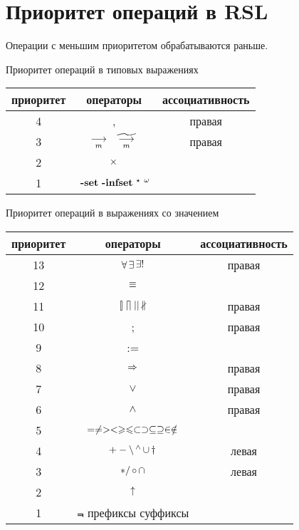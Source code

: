 \chapter{Приоритет операций в RSL}\label{sec:priority}

Операции с меньшим приоритетом обрабатываются раньше.

Приоритет операций в типовых выражениях
\begin{center}
\begin{tabular}{|c|c|c|}
\hline приоритет & операторы & ассоциативность\\
\hline  4 & , & правая\\
\hline  3 & $~\mathop{\longrightarrow}\limits_{m}~ ~\widetilde{~\mathop{\longrightarrow}\limits_{m}~}~$ & правая\\
\hline  2 & $\mathop{\times}$ & \\
\hline  1 & ${\ }\Set {\ }\Infset {\ }\List {\ }\Inflist$ & \\
\hline
\end{tabular}
\end{center}

Приоритет операций в выражениях со значением
\begin{center}
\begin{tabular}{|c|c|c|}
\hline приоритет & операторы & ассоциативность\\
\hline 13 & $\mathop{\forall} \mathop{\exists} \mathop{\exists!}$ & правая \\
\hline 12 & $\mathop{\equiv}$ & \\
\hline 11 & $\mathop{[\!]} \mathop{\lceil\!\rceil} || \mathop{\nparallel}$ & правая \\
\hline 10 & ; & правая \\
\hline 9 & := & \\
\hline 8 & $\mathop{\Rightarrow}$ & правая \\
\hline 7 & $\vee$ & правая \\
\hline 6 & $\wedge$ & правая \\
\hline 5 & $= \neq > < \geqslant\leqslant \subset \supset \subseteq \supseteq
\in \notin$ &  \\
\hline 4 & $+ - \mathop{\setminus} \mathop{{ }^\wedge} \mathop{\cup} \mathop{\dag}$ & левая \\
\hline 3 & $* / \mathop{\circ} \mathop{\cap}$ & левая \\
\hline 2 & $\uparrow$ & \\
\hline 1 & $\Not$ префиксы суффиксы& \\
\hline
\end{tabular}
\end{center}
